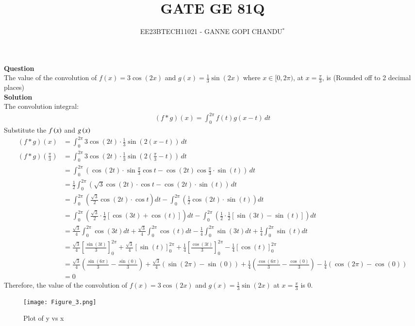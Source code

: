 \documentclass[journal,12pt,onecolumn]{IEEEtran}
\theoremstyle{remark}
\begin{document}

\vspace{3cm}
\title{GATE GE 81Q}
\author{EE23BTECH11021 - GANNE GOPI CHANDU$^{*}$%
}
\maketitle
\bigskip
\renewcommand{\thefigure}{\theenumi}
\renewcommand{\thetable}{\theenumi}

\textbf{Question}\\
The value of the convolution of $f(x) = 3\cos(2x)$ and $g(x) = \frac{1}{3}\sin(2x)$ where $x \in [0, 2\pi)$, at $x = \frac{\pi}{3}$, is (Rounded off to 2 decimal places)\\
\textbf{Solution}\\
The convolution integral:
\begin{align}
    (f * g)(x) = \int_{0}^{2\pi} f(t) g(x - t) \, dt
\end{align}
Substitute the $f\left(x\right)$ and $g\left(x\right)$\\
\begin{align} 
     (f * g)(x) &= \int_{0}^{2\pi} 3\cos(2t) \cdot \frac{1}{3}\sin(2(x - t)) \, dt\\
     (f * g)\left(\frac{\pi}{3}\right) &= \int_{0}^{2\pi} 3\cos(2t) \cdot \frac{1}{3}\sin\left(2\left(\frac{\pi}{3} - t\right)\right) \, dt\\
     &= \int_{0}^{2\pi} \left(\cos(2t) \cdot \sin\frac{\pi}{3}\cos{t} - \cos(2t)\cos\frac{\pi}{3} \cdot \sin(t)\right) \, dt\\
     &=\frac{1}{2}\int_{0}^{2\pi} \left(\sqrt{3}\cos(2t) \cdot\cos{t} - \cos(2t) \cdot \sin(t)\right) \, dt\\
     &=\int_{0}^{2\pi} \left(\frac{\sqrt{3}}{2}\cos(2t) \cdot\cos{t}\right)dt - \int_{0}^{2\pi}\left(\frac{1}{2}\cos(2t) \cdot \sin(t)\right) dt\\
     &=\int_{0}^{2\pi} \left(\frac{\sqrt{3}}{2}\cdot\frac{1}{2}\left[\cos(3t) + \cos(t)\right]\right)dt - \int_{0}^{2\pi}\left(\frac{1}{2}\cdot\frac{1}{2}\left[\sin(3t) - \sin(t)\right]\right) dt\\
     &=\frac{\sqrt{3}}{4}\int_{0}^{2\pi} \cos(3t) dt + \frac{\sqrt{3}}{4}\int_{0}^{2\pi} \cos(t) dt - \frac{1}{4}\int_{0}^{2\pi} \sin(3t) dt + \frac{1}{4}\int_{0}^{2\pi} \sin(t) dt\\
     &= \frac{\sqrt{3}}{4} \left[\frac{\sin(3t)}{3}\right]_{0}^{2\pi} + \frac{\sqrt{3}}{4} \left[\sin(t)\right]_{0}^{2\pi} + \frac{1}{4} \left[\frac{\cos(3t)}{3}\right]_{0}^{2\pi} - \frac{1}{4} \left[\cos(t)\right]_{0}^{2\pi}\\
     &=\frac{\sqrt{3}}{4} \left(\frac{\sin(6\pi)}{3} - \frac{\sin(0)}{3}\right) + \frac{\sqrt{3}}{4} \left(\sin(2\pi) - \sin(0)\right) + \frac{1}{4} \left(\frac{\cos(6\pi)}{3} - \frac{\cos(0)}{3}\right) - \frac{1}{4} \left(\cos(2\pi) - \cos(0)\right)\\
     &=0
\end{align}
Therefore, the value of the convolution of $f(x) = 3\cos(2x)$ and $g(x) = \frac{1}{3}\sin(2x)$ at $x = \frac{\pi}{3}$ is $0$.\\
\begin{figure}
    \centering
    \texttt{[image: Figure\_3.png]}
    \caption{Plot of y vs x}
    \label{fig:2}
\end{figure}\\
\end{document}
